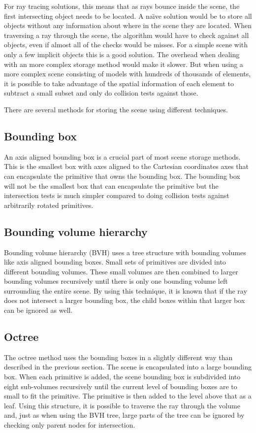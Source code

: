 \documentclass[]{report}   %
\begin{document}
For ray tracing solutions, this means that as rays bounce inside the scene, the first intersecting object needs to be located.
A na\"{\i}ve solution would be to store all objects without any information about where in the scene they are located.
When traversing a ray through the scene, the algorithm would have to check against all objects, even if almost all of the checks would be misses.
For a simple scene with only a few implicit objects this is a good solution. The overhead when dealing with an more complex storage method would make it slower.
But when using a more complex scene consisting of models with hundreds of thousands of elements, it is possible to take advantage of the spatial information of each element to subtract a small subset and only do collision tests against those.

There are several methods for storing the scene using different techniques.

\subsection{Bounding box}
An axis aligned bounding box is a crucial part of most scene storage methods.
This is the smallest box with axes aligned to the Cartesian coordinates axes that can encapsulate the primitive that owns the bounding box.
The bounding box will not be the smallest box that can encapsulate the primitive but the intersection tests is much simpler compared to doing collision tests against arbitrarily rotated primitives.

\subsection{Bounding volume hierarchy}
Bounding volume hierarchy (BVH) uses a tree structure with bounding volumes like axis aligned bounding boxes. 
Small sets of primitives are divided into different bounding volumes.
These small volumes are then combined to larger bounding volumes recursively until there is only one bounding volume left surrounding the entire scene.
By using this technique, it is known that if the ray does not intersect a larger bounding box, the child boxes within that larger box can be ignored as well.

\subsection{Octree}
The octree method uses the bounding boxes in a slightly different way than described in the previous section.
The scene is encapsulated into a large bounding box.
When each primitive is added, the scene bounding box is subdivided into eight sub-volumes recursively until the current level of bounding boxes are to small to fit the primitive.
The primitive is then added to the level above that as a leaf.
Using this structure, it is possible to traverse the ray through the volume and, just as when using the BVH tree, large parts of the tree can be ignored by checking only parent nodes for intersection.
\end{document}
